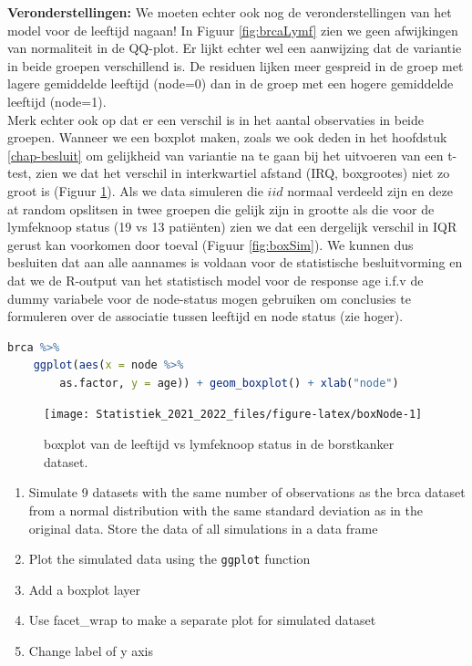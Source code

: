 \documentclass[
  12pt,dutch,coursenotes]{book}
\newcommand{\passthrough}[1]{#1}
\providecommand{\tightlist}{%
  \setlength{\itemsep}{0pt}\setlength{\parskip}{0pt}}
\theoremstyle{definition}
\theoremstyle{definition}
\theoremstyle{definition}
\theoremstyle{definition}
\theoremstyle{remark}
\begin{document}
\textbf{Veronderstellingen:} We moeten echter ook nog de veronderstellingen van het model voor de leeftijd nagaan! In Figuur \ref{fig:brcaLymf} zien we geen afwijkingen van normaliteit in de QQ-plot.
Er lijkt echter wel een aanwijzing dat de variantie in beide groepen verschillend is. De residuen lijken meer gespreid in de groep met lagere gemiddelde leeftijd (node=0) dan in de groep met een hogere gemiddelde leeftijd (node=1).\\
Merk echter ook op dat er een verschil is in het aantal observaties in beide groepen.
Wanneer we een boxplot maken, zoals we ook deden in het hoofdstuk \ref{chap-besluit} om gelijkheid van variantie na te gaan bij het uitvoeren van een t-test, zien we dat het verschil in interkwartiel afstand (IRQ, boxgrootes) niet zo groot is (Figuur \ref{fig:boxNode}).
Als we data simuleren die \(iid\) normaal verdeeld zijn en deze at random opslitsen in twee groepen die gelijk zijn in grootte als die voor de lymfeknoop status (19 vs 13 patiënten) zien we dat een dergelijk verschil in IQR gerust kan voorkomen door toeval (Figuur \ref{fig:boxSim}).
We kunnen dus besluiten dat aan alle aannames is voldaan voor de statistische besluitvorming en dat we de R-output van het statistisch model voor de response age i.f.v de dummy variabele voor de node-status mogen gebruiken om conclusies te formuleren over de associatie tussen leeftijd en node status (zie hoger).

\begin{lstlisting}[language=R]
brca %>%
    ggplot(aes(x = node %>%
        as.factor, y = age)) + geom_boxplot() + xlab("node")
\end{lstlisting}

\begin{figure}

{\centering \texttt{[image: Statistiek\_2021\_2022\_files/figure-latex/boxNode-1]} 

}

\caption{boxplot van de leeftijd vs lymfeknoop status in de borstkanker dataset.}\label{fig:boxNode}
\end{figure}

\begin{enumerate}
\def\labelenumi{\arabic{enumi}.}
\tightlist
\item
  Simulate 9 datasets with the same number of observations as the brca dataset from a normal distribution with the same standard deviation as in the original data. Store the data of all simulations in a data frame
\item
  Plot the simulated data using the \passthrough{\lstinline!ggplot!} function
\item
  Add a boxplot layer
\item
  Use facet\_wrap to make a separate plot for simulated dataset
\item
  Change label of y axis
\end{enumerate}
\end{document}
